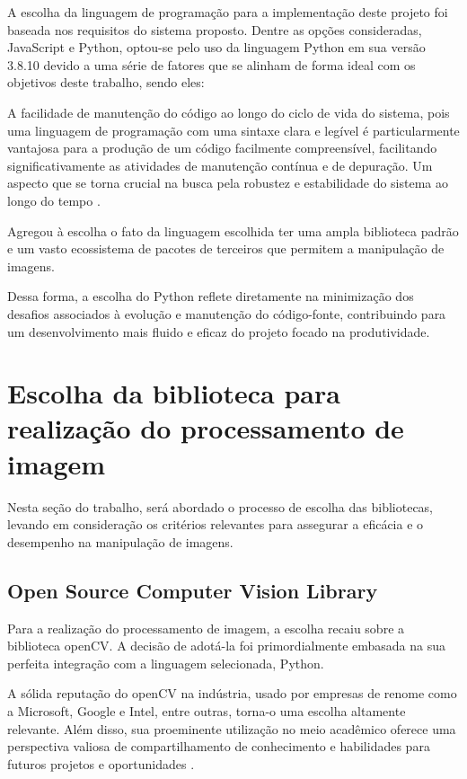 A escolha da linguagem de programação para a implementação deste projeto foi baseada nos requisitos do sistema proposto. Dentre as opções consideradas, JavaScript e Python, optou-se pelo uso da linguagem Python em sua versão 3.8.10 devido a uma série de fatores que se alinham de forma ideal com os objetivos deste trabalho, sendo eles:

A facilidade de manutenção do código ao longo do ciclo de vida do sistema, pois uma linguagem de programação com uma sintaxe clara e legível é particularmente vantajosa para a produção de um código facilmente compreensível, facilitando significativamente as atividades de manutenção contínua e de depuração. Um aspecto que se torna crucial na busca pela robustez e estabilidade do sistema ao longo do tempo \cite{clean_code}.

Agregou à escolha o fato da linguagem escolhida ter uma ampla biblioteca padrão e um vasto ecossistema de pacotes de terceiros que permitem a manipulação de imagens.

Dessa forma, a escolha do Python reflete diretamente na minimização dos desafios associados à evolução e manutenção do código-fonte, contribuindo para um desenvolvimento mais fluido e eficaz do projeto focado na produtividade.



\section[Escolha da biblioteca para realização do processamento de imagem]{Escolha da biblioteca para realização do processamento de imagem}\label{sec:Escolha da biblioteca para realizacao do processamento de imagem}

Nesta seção do trabalho, será abordado o processo de escolha das bibliotecas, levando em consideração os critérios relevantes para assegurar a eficácia e o desempenho na manipulação de imagens.

\subsection{Open Source Computer Vision Library}
Para a realização do processamento de imagem, a escolha recaiu sobre a biblioteca \ac{openCV}. A decisão de adotá-la foi primordialmente embasada na sua perfeita integração com a linguagem selecionada, Python.

A sólida reputação do \ac{openCV} na indústria, usado por empresas de renome como a Microsoft, Google e Intel, entre outras, torna-o uma escolha altamente relevante. Além disso, sua proeminente utilização no meio acadêmico oferece uma perspectiva valiosa de compartilhamento de conhecimento e habilidades para futuros projetos e oportunidades \cite{opencv_docs}. 

